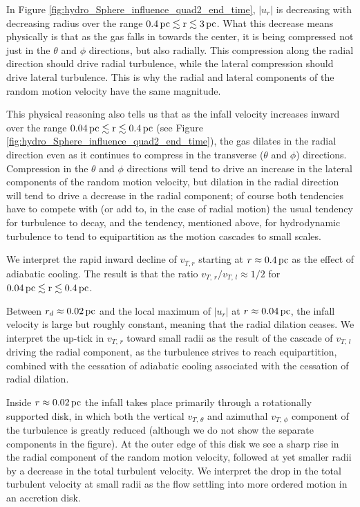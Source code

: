\documentclass[../dissertation.tex]{subfiles}
\begin{document}
In Figure \ref{fig:hydro_Sphere_influence_quad2_end_time}, $|u_r|$ is
decreasing with decreasing radius over the range $0.4\,\rm pc\lesssim r\lesssim 3\,\rm pc$.
What this decrease means physically is that as the
gas falls in towards the center, it is being compressed not just
in the $\theta$ and $\phi$ directions, but also radially. This
compression along the radial direction should drive radial turbulence,
while the lateral compression should drive lateral
turbulence. This is why the radial and lateral components of the random motion
velocity have the same magnitude. 

This physical reasoning also tells us that as the infall velocity
increases inward over the range $0.04\,\rm pc\lesssim r\lesssim 0.4\,\rm pc$
(see Figure \ref{fig:hydro_Sphere_influence_quad2_end_time}), 
the gas dilates in the radial direction even as it continues to compress 
in the transverse ($\theta$ and $\phi$) directions. Compression in the
$\theta$ and $\phi$ directions will tend to drive an increase in the
lateral components of the random motion velocity, but dilation
in the radial direction will tend to drive a decrease in the radial
component; of course both tendencies have to compete with (or add to,
in the case of radial motion) the usual tendency for turbulence to
decay, and the tendency, mentioned above, for hydrodynamic turbulence
to tend to equipartition as the motion cascades to small scales. 

We interpret the rapid inward decline of $v_{T,r}$
starting at $r\approx0.4\,\rm pc$ as the effect of adiabatic cooling. The result
is that the ratio $v_{T,\, r}/v_{T,\, l}\approx 1/2$ for $0.04\,\rm pc\lesssim r\lesssim 0.4\,\rm pc$. 

Between $r_d\approx0.02\,\rm pc$ and the local maximum of $|u_r|$ at
$r\approx0.04\,\rm pc$, the infall velocity is large but roughly constant,
meaning that the radial dilation ceases. We interpret the up-tick in
$v_{T,\, r}$ toward small radii as the result of the cascade of
$v_{T,\,l}$ driving the radial component, as the turbulence strives
to reach equipartition, combined with the cessation of adiabatic cooling 
associated with the cessation of radial dilation.  

Inside $r\approx 0.02\,\rm pc$ the infall takes place primarily through a rotationally 
supported disk, in which both the vertical $v_{T,\, \theta}$ and 
azimuthal $v_{T,\, \phi}$ component of the turbulence is greatly reduced 
(although we do not show the separate components in the figure). At the 
outer edge of this 
disk we see a sharp rise in the radial component of the random motion velocity, 
followed at yet smaller radii by a decrease in the total turbulent velocity. 
We interpret the drop in the total turbulent
velocity at small radii as the flow settling into more ordered motion in an accretion disk.
\end{document}
